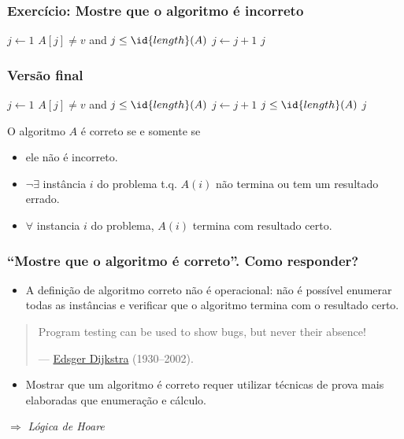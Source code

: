 \documentclass{beamer}
\begin{document}
\begin{frame}

\frametitle{Exercício: Mostre que o algoritmo é incorreto}

\begin{codebox}
\li $j \gets 1$
\li \While $A[j] \neq v$ and $j \le \id{length}(A)$
\li \Do
      $j \gets j+1$
    \End
\li \Return $j$
\end{codebox}  

\end{frame}

\begin{frame}

\frametitle{Versão final}

\begin{codebox}
\li $j \gets 1$
\li \While $A[j] \neq v$ and $j \le \id{length}(A)$
\li \Do
      $j \gets j+1$
    \End
\li \If $j \le \id{length}(A)$
\li \Then
      \Return $j$
\li \Else
      \Return {}
    \End
\end{codebox}  

\pause

O algoritmo $A$ é correto se e somente se 
\begin{itemize}
\item ele não é incorreto. \pause
\item $\neg \exists$ instância $i$ do problema t.q. $A(i)$ não termina ou tem um resultado errado. \pause
\item $\forall$ instancia $i$ do problema, $A(i)$ termina com resultado certo.
\end{itemize}

\end{frame}

\begin{frame}

\frametitle{``Mostre que o algoritmo é correto''. Como responder?}

\begin{itemize}
\item A definição de algoritmo correto não é operacional: não é possível
enumerar todas as instâncias e verificar que o algoritmo termina com o resultado certo.
\end{itemize}

\begin{quote}
Program testing can be used to show bugs, but never their absence!

--- \href{http://en.wikipedia.org/wiki/Edsger_W._Dijkstra}{Edsger Dijkstra} (1930--2002).
\end{quote}

\begin{itemize}
\item Mostrar que um algoritmo é correto requer utilizar técnicas de prova mais
  elaboradas que enumeração e cálculo.
\end{itemize}

\pause

\begin{center}
$\Rightarrow$ \emph{Lógica de Hoare}
\end{center}

\end{frame}
\end{document}

